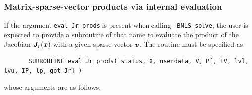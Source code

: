 \documentclass{galahad}
\newcommand{\packagename}{BNLS}
\newcommand{\fullpackagename}{\libraryname\_\packagename}
\newcommand{\solver}{{\tt \fullpackagename\_solve}}
\begin{document}

\subsubsection{Matrix-sparse-vector products via internal evaluation\label{jvps}}

If the argument {\tt eval\_Jr\_prods} is present when calling \solver, the
user is expected to provide a subroutine of that name to evaluate the
product of the Jacobian ${\bm{J}}_r({\bm{x}})$ with a given sparse vector ${\bm{v}}$.
The routine must be specified as

\def\baselinestretch{0.8}
{\tt \begin{verbatim}
       SUBROUTINE eval_Jr_prods( status, X, userdata, V, P[, IV, lvl, lvu, IP, lp, got_Jr] )
\end{verbatim} }
\def\baselinestretch{1.0}
\noindent whose arguments are as follows:
\end{document}
